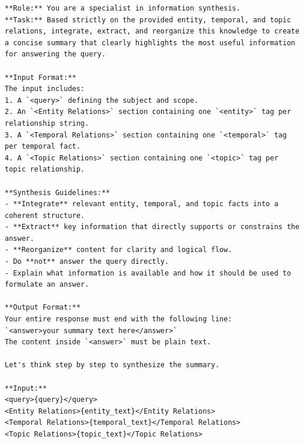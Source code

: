 \begin{center}
\begin{tcolorbox}[title={SUMMARY MODULE PROMPT (Mid)}]
\begin{Verbatim}[breaklines, breakanywhere,fontfamily=tt, fontseries=b, baselinestretch=0.95]
**Role:** You are a specialist in information synthesis.
**Task:** Based strictly on the provided entity, temporal, and topic relations, integrate, extract, and reorganize this knowledge to create a concise summary that clearly highlights the most useful information for answering the query.

**Input Format:**
The input includes:
1. A `<query>` defining the subject and scope.
2. An `<Entity Relations>` section containing one `<entity>` tag per relationship string.
3. A `<Temporal Relations>` section containing one `<temporal>` tag per temporal fact.
4. A `<Topic Relations>` section containing one `<topic>` tag per topic relationship.

**Synthesis Guidelines:**
- **Integrate** relevant entity, temporal, and topic facts into a coherent structure.
- **Extract** key information that directly supports or constrains the answer.
- **Reorganize** content for clarity and logical flow.
- Do **not** answer the query directly.
- Explain what information is available and how it should be used to formulate an answer.

**Output Format:**
Your entire response must end with the following line:
`<answer>your summary text here</answer>`
The content inside `<answer>` must be plain text.

Let's think step by step to synthesize the summary.

**Input:**
<query>{query}</query>
<Entity Relations>{entity_text}</Entity Relations>
<Temporal Relations>{temporal_text}</Temporal Relations>
<Topic Relations>{topic_text}</Topic Relations>
\end{Verbatim}
\end{tcolorbox}
\end{center}


